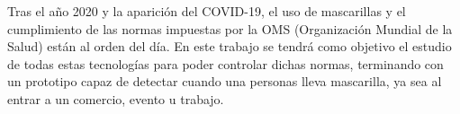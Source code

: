 Tras el año 2020 y la aparición del COVID-19, el uso de mascarillas y el cumplimiento de las normas impuestas por la OMS (Organización Mundial de la Salud) están al orden del día. En este trabajo se tendrá como objetivo el estudio de todas estas tecnologías para poder controlar dichas normas, terminando con un prototipo capaz de detectar cuando una personas lleva mascarilla, ya sea al entrar a un comercio, evento u trabajo.


